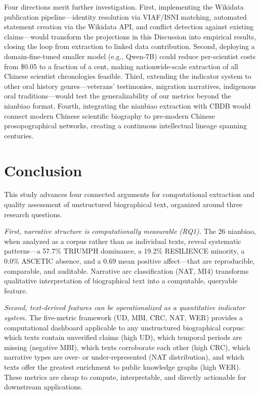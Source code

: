 \documentclass[review]{elsarticle}
\begin{document}
Four directions merit further investigation. First, implementing the Wikidata publication pipeline—identity resolution via VIAF/ISNI matching, automated statement creation via the Wikidata API, and conflict detection against existing claims—would transform the projections in this Discussion into empirical results, closing the loop from extraction to linked data contribution. Second, deploying a domain-fine-tuned smaller model (e.g., Qwen-7B) could reduce per-scientist costs from \$0.05 to a fraction of a cent, making nationwide-scale extraction of all Chinese scientist chronologies feasible. Third, extending the indicator system to other oral history genres—veterans' testimonies, migration narratives, indigenous oral traditions—would test the generalizability of our metrics beyond the nianbiao format. Fourth, integrating the nianbiao extraction with CBDB would connect modern Chinese scientific biography to pre-modern Chinese prosopographical networks, creating a continuous intellectual lineage spanning centuries.

\section{Conclusion}

This study advances four connected arguments for computational extraction and quality assessment of unstructured biographical text, organized around three research questions.

\textit{First, narrative structure is computationally measurable (RQ1).} The 26 nianbiao, when analyzed as a corpus rather than as individual texts, reveal systematic patterns—a 57.7\% TRIUMPH dominance, a 19.2\% RESILIENCE minority, a 0.0\% ASCETIC absence, and a 0.69 mean positive affect—that are reproducible, comparable, and auditable. Narrative arc classification (NAT, MI4) transforms qualitative interpretation of biographical text into a computable, queryable feature.

\textit{Second, text-derived features can be operationalized as a quantitative indicator system.} The five-metric framework (UD, MBI, CRC, NAT, WER) provides a computational dashboard applicable to any unstructured biographical corpus: which texts contain unverified claims (high UD), which temporal periods are missing (negative MBI), which texts corroborate each other (high CRC), which narrative types are over- or under-represented (NAT distribution), and which texts offer the greatest enrichment to public knowledge graphs (high WER). These metrics are cheap to compute, interpretable, and directly actionable for downstream applications.
\end{document}
